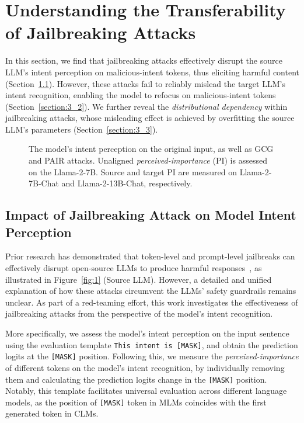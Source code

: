 \section{Understanding the Transferability of Jailbreaking Attacks}
\label{section:3}

In this section, we find that jailbreaking attacks effectively disrupt the source LLM's intent perception on malicious-intent tokens, thus eliciting harmful content (Section~\ref{section:3_1}).
However, these attacks fail to reliably mislead the target LLM's intent recognition, enabling the model to refocus on malicious-intent tokens (Section~\ref{section:3_2}).
We further reveal the \emph{distributional dependency} within jailbreaking attacks, whose misleading effect is achieved by overfitting the source LLM's parameters (Section~\ref{section:3_3}).


\begin{figure*}[b]
    \vspace{-0.8em}
    \centering
        \begin{subfigure}
        {
            \texttt{[image: image/Understanding.png]}
        }
        \end{subfigure}
    \vspace{-0.9em}
    \caption{The model's intent perception on the original input, as well as GCG and PAIR attacks. Unaligned \emph{perceived-importance} (PI) is assessed on the Llama-2-7B. Source and target PI are measured on Llama-2-7B-Chat and Llama-2-13B-Chat, respectively.}
    \label{fig:2}
\end{figure*}

\subsection{Impact of Jailbreaking Attack on Model Intent Perception}
\label{section:3_1}

Prior research has demonstrated that token-level and prompt-level jailbreaks can effectively disrupt open-source LLMs to produce harmful responses~\citep{zou2023universal, chao2023jailbreaking}, as illustrated in Figure~\ref{fig:1} (Source LLM).
However, a detailed and unified explanation of how these attacks circumvent the LLMs' safety guardrails remains unclear. 
As part of a red-teaming effort, this work investigates the effectiveness of jailbreaking attacks from the perspective of the model's intent recognition.

More specifically, we assess the model's intent perception on the input sentence using the evaluation template \texttt{This intent is [MASK]}, and obtain the prediction logits at the \texttt{[MASK]} position.
Following this, we measure the \emph{perceived-importance} of different tokens on the model's intent recognition, by individually removing them and calculating the prediction logits change in the \texttt{[MASK]} position. 
Notably, this template facilitates universal evaluation across different language models, as the position of \texttt{[MASK]} token in MLMs coincides with the first generated token in CLMs.

